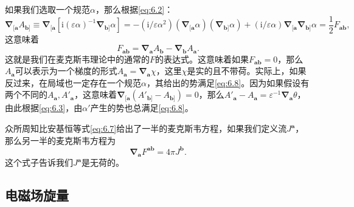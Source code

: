 如果我们选取一个规范$\alpha $，那么根据\ref{eq:6.2}：
\begin{equation*}
	\boldsymbol{\nabla }_{[\boldsymbol{a}} A_{\boldsymbol{b}]} \equiv \boldsymbol{\nabla }\mathrm{_{[\boldsymbol{a}}} [\mathrm{i} (\varepsilon \alpha )^{-1}\boldsymbol{\nabla }_{\boldsymbol{b}]} \alpha ]=-(\mathrm{i} /\varepsilon \alpha ^{2} )(\boldsymbol{\nabla }_{[\boldsymbol{a}} \alpha )(\boldsymbol{\nabla }_{\boldsymbol{b}]} \alpha )+(\mathrm{i} /\varepsilon \alpha )\boldsymbol{\nabla }_{[\boldsymbol{a}}\boldsymbol{\nabla }_{\boldsymbol{b}]} \alpha =\frac{1}{2} F_{\boldsymbol{ab}} ,
\end{equation*}
这意味着
\begin{equation}
	F_{\boldsymbol{ab}} =\boldsymbol{\nabla }_{\boldsymbol{a}} A_{\boldsymbol{b}} -\boldsymbol{\nabla }_{\boldsymbol{b}} A_{\boldsymbol{a}} .
	\label{eq:6.8}
\end{equation}
这就是我们在麦克斯韦理论中的通常的$F$的表达式。这意味着如果$F_{\boldsymbol{ab}} =0$，那么$A_{\boldsymbol{a}}$可以表示为一个梯度的形式$A_{\boldsymbol{a}} =\boldsymbol{\nabla }_{\boldsymbol{a}} \chi $，这里$\chi $是实的且不带荷。实际上，如果反过来，在局域也一定存在一个规范$\alpha $，其给出的势满足\ref{eq:6.8}。因为如果假设有两个不同的$A_{\boldsymbol{a}} ,A'_{\boldsymbol{a}}$，这意味着$\boldsymbol{\nabla }_{[\boldsymbol{a}} (A'_{\boldsymbol{b}]} -A_{\boldsymbol{b}]} )=0$，那么$A'_{\boldsymbol{a}} -A_{\boldsymbol{a}} =\varepsilon ^{-1}\boldsymbol{\nabla }_{\boldsymbol{a}} \theta $，由此根据\ref{eq:6.3}，由$\alpha '$产生的势也总满足\ref{eq:6.8}。



众所周知比安基恒等式\ref{eq:6.7}给出了一半的麦克斯韦方程，如果我们定义流$J^{\boldsymbol{a}}$，那么另一半的麦克斯韦方程为
\begin{equation}
	\boldsymbol{\nabla }_{\boldsymbol{a}} F^{\boldsymbol{ab}} =4\pi J^{\boldsymbol{b}} .
	\label{eq:6.9}
\end{equation}
这个式子告诉我们$J^{\boldsymbol{a}}$是无荷的。


\subsection{电磁场旋量}

